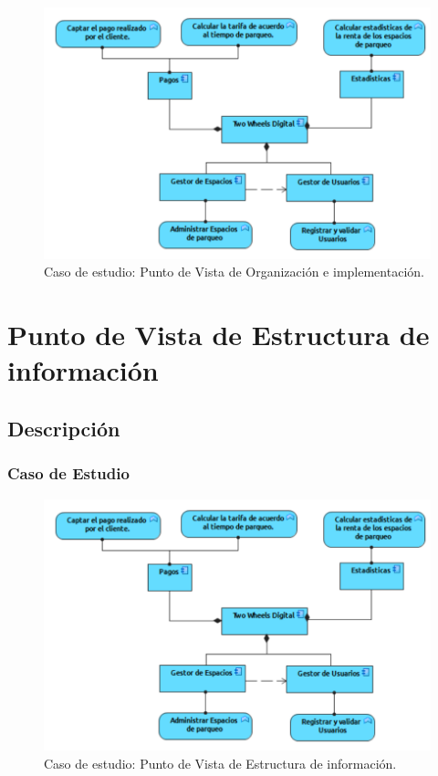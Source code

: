 \begin{figure}[H]
	\centering
	\includegraphics[width=1.0\textwidth]{imagenes/Caso_Estudio/Tecnologia/ComAplicacion.PDF}
	\caption{Caso de estudio: Punto de Vista de Organización e implementación.}
	\label{fig:gap_analysis}
\end{figure}


\section{Punto de Vista de Estructura de información}
\subsection{Descripción}


\subsubsection{Caso de Estudio}


\begin{figure}[H]
	\centering
	\includegraphics[width=1.0\textwidth]{imagenes/Caso_Estudio/Tecnologia/ComAplicacion.PDF}
	\caption{Caso de estudio: Punto de Vista de Estructura de información.}
	\label{fig:gap_analysis}
\end{figure}


